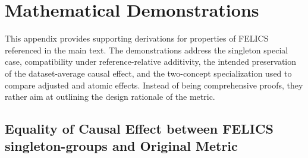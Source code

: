 \chapter{Mathematical Demonstrations}
\label{app:mathematical_demonstrations}
This appendix provides supporting derivations for properties of FELICS referenced in the main text. The demonstrations address the singleton special case, compatibility under reference-relative additivity, the intended preservation of the dataset-average causal effect, and the two-concept specialization used to compare adjusted and atomic effects. Instead of being comprehensive proofs, they rather aim at outlining the design rationale of the metric.

\section*{Equality of Causal Effect between FELICS singleton-groups and Original Metric}
